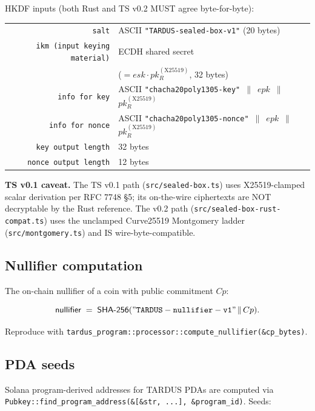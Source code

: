 HKDF inputs (both Rust and TS v0.2 MUST agree byte-for-byte):

\begin{center}\small
\begin{tabular}{rl}
\toprule
\texttt{salt}             & ASCII \texttt{"TARDUS-sealed-box-v1"} (20 bytes) \\
\texttt{ikm (input keying material)} & ECDH shared secret \\
                          & ($= esk \cdot pk_R^{(\mathrm{X25519})}$, 32 bytes) \\
\texttt{info for key}     & ASCII \texttt{"chacha20poly1305-key"} $\,\|\,$ $epk$ $\,\|\,$ $pk_R^{(\mathrm{X25519})}$ \\
\texttt{info for nonce}   & ASCII \texttt{"chacha20poly1305-nonce"} $\,\|\,$ $epk$ $\,\|\,$ $pk_R^{(\mathrm{X25519})}$ \\
\texttt{key output length} & 32 bytes \\
\texttt{nonce output length} & 12 bytes \\
\bottomrule
\end{tabular}
\end{center}

\textbf{TS v0.1 caveat.} The TS v0.1 path (\texttt{src/sealed-box.ts})
uses X25519-clamped scalar derivation per RFC 7748 §5; its
on-the-wire ciphertexts are NOT decryptable by the Rust
reference. The v0.2 path
(\texttt{src/sealed-box-rust-compat.ts}) uses the unclamped
Curve25519 Montgomery ladder
(\texttt{src/montgomery.ts}) and IS wire-byte-compatible.

\subsection{Nullifier computation}
\label{sec:vec-nullifier}

The on-chain nullifier of a coin with public commitment $Cp$:

\[
  \mathsf{nullifier} \;=\; \mathsf{SHA\text{-}256}(\mathtt{"TARDUS-nullifier-v1"} \,\|\, Cp).
\]

Reproduce with
\texttt{tardus\_program::processor::compute\_nullifier(\&cp\_bytes)}.

\subsection{PDA seeds}
\label{sec:vec-pda-seeds}

Solana program-derived addresses for TARDUS PDAs are computed
via \texttt{Pubkey::find\_program\_address(\&[\&str, ...], \&program\_id)}.
Seeds:

